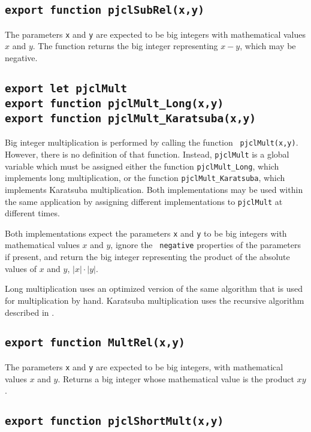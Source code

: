 \documentclass[12pt]{article}
\begin{document}
\subsection{\tt export function pjclSubRel(x,y)}

The parameters {\tt x} and {\tt y} are expected to be big
integers with mathematical values $x$ and $y$.  The function returns
the big integer representing $x-y$, which may be negative.

\subsection{\tt export let pjclMult\\export function pjclMult\_Long(x,y)\\export function pjclMult\_Karatsuba(x,y)}

Big integer multiplication is performed by calling the function {\tt
 pjclMult(x,y)}.  However, there is no definition of that function.
Instead, {\tt pjclMult} is a global variable which must be assigned
either the function {\tt pjclMult\_Long}, which implements long
multiplication, or the function {\tt pjclMult\_Karatsuba}, which
implements Karatsuba multiplication.  Both implementations may be used
within the same application by assigning different implementations to
{\tt pjclMult} at different times.

Both implementations expect the parameters {\tt x} and {\tt y} to be
big integers with mathematical values $x$ and $y$, ignore the {\tt
  negative} properties of the parameters if present, and return the big integer representing the
product of the absolute values of $x$ and $y$, $|x|\cdot|y|$.

Long multiplication uses an optimized version of the same algorithm
that is used for multiplication by hand.  Karatsuba multiplication
uses the recursive algorithm described in
\cite[\S~15.1.2]{gmp-manual}.

\subsection{\tt export function MultRel(x,y)}

The parameters {\tt x} and {\tt y} are expected to be big integers,
with mathematical values $x$ and $y$.  Returns a big integer whose
mathematical value is the product $xy$.

\subsection{\tt export function pjclShortMult(x,y)}
\end{document}
